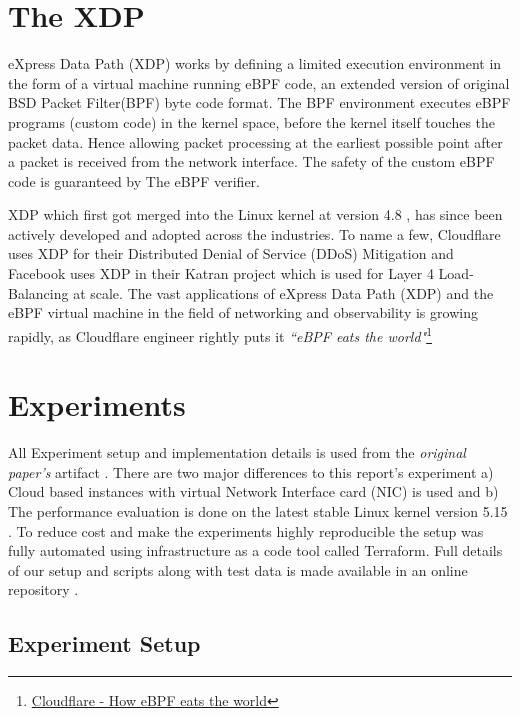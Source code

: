 \documentclass[12pt,titlepage]{article}
\begin{document}
\section{The XDP}

eXpress Data Path (XDP) works by defining a limited execution environment in the form of a virtual machine running eBPF code, an extended version of original BSD Packet Filter(BPF) \cite{mccanne_bsd_1993} byte code format.  The BPF environment executes eBPF programs (custom code) in the kernel space, before the kernel itself touches the packet data. Hence allowing packet processing at the earliest possible point after a packet is received from the network interface. The safety of the custom eBPF code is guaranteed  by The eBPF verifier. 

XDP which first got merged into the Linux kernel at version 4.8 , has since been actively developed and adopted across the industries. To name a few, Cloudflare uses XDP for their Distributed Denial of Service (DDoS) Mitigation \cite{cloudflare-ddos} and Facebook uses XDP in their Katran \cite{katran} project which is used for  Layer 4 Load-Balancing at scale. The vast applications of eXpress Data Path (XDP) and the eBPF virtual machine in the field of networking and observability is growing rapidly,  as Cloudflare engineer rightly puts it \textit{``eBPF  eats the world"}\footnote{\href{https://blog.cloudflare.com/cloudflare-architecture-and-how-bpf-eats-the-world/}{Cloudflare - How eBPF eats the world}} 


\section{Experiments}

All Experiment setup and implementation details is used from the \textit{original paper's} artifact \cite{xdp-test-data} . There are two major differences to this report's experiment a) Cloud based instances with virtual Network Interface card (NIC) is used and b) The performance evaluation is done on the latest stable Linux kernel version 5.15 . To reduce cost and make the experiments highly reproducible  the setup was fully automated using infrastructure as a code tool called Terraform. Full details of our setup and scripts along with test data is made available in an online repository \cite{xdp-exp}.


\subsection{Experiment Setup}
\end{document}
